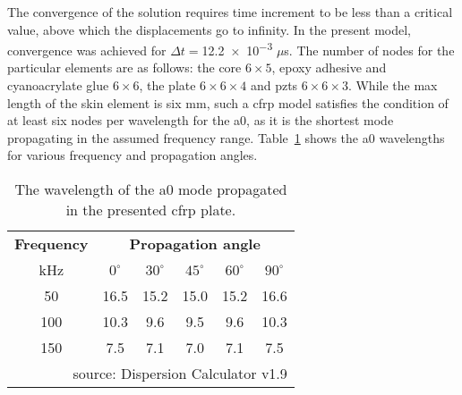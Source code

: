 The convergence of the solution requires time increment to be less than a critical value, above which the displacements go to infinity.
In the present model, convergence was achieved for \(\Delta t=\)\num{12.2e-3} \(\mu\)s.
The number of nodes for the particular elements are as follows: the core \(6 \times 5\), epoxy adhesive and cyanoacrylate glue \(6 \times 6\), the plate \(6 \times 6 \times 4\) and \acp{pzt} \(6 \times 6 \times 3\).
While the max length of the skin element is six mm, such a \ac{cfrp} model satisfies the condition of at least six nodes per wavelength for the \ac{a0}, as it is the shortest mode propagating in the assumed frequency range.
Table~\ref{tab:wavelength} shows the \ac{a0} wavelengths for various frequency and propagation angles.
\begin{table}[H]
	\small
	\tabcolsep=0.75cm
	\caption{\label{tab:wavelength}The wavelength of the \ac{a0} mode propagated in the presented \ac{cfrp} plate.}
	\begin{tabular}{cccccc}
		\toprule
		\textbf{Frequency} & \multicolumn{5}{c}{\textbf{Propagation angle}}\\
		kHz & \(0^{\circ}\) & \(30^{\circ}\) & \(45^{\circ}\) & \(60^{\circ}\) & \(90^{\circ}\)\\
		\midrule
		50 & 16.5& 15.2&15.0&15.2&16.6\\
		100 & 10.3& 9.6&9.5&9.6&10.3\\
		150 & 7.5& 7.1&7.0&7.1&7.5\\
		\bottomrule
		\multicolumn{6}{r}{{\scriptsize{source: Dispersion Calculator v1.9}}}
	\end{tabular}
\end{table}